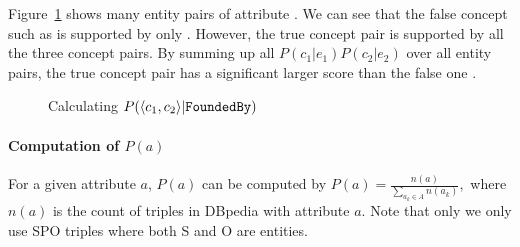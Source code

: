 {\footnotesize
\begin{example}
\label{exa:pggga}
Figure~\ref{fig:bipartite} shows many entity pairs of attribute . 
We can see that the false concept such as  is supported by only .
However, the true concept pair  is supported by all the three concept pairs. 
By summing up all $P(c_1|e_1)P(c_2|e_2) $ over all entity pairs, the true concept pair  has a significant larger score than the false one .
\end{example}
}


\begin{figure}[!htb]
\vspace{-6mm}
\centering
{}
\vspace{-8mm}
\caption{Calculating $P(  \langle {c}_{1},{c}_{2} \rangle  | {\tt FoundedBy} )$ }
\label{fig:bipartite}
\vspace{-3mm}
\end{figure}

\vspace{-2mm}
\paragraph{Computation of $P(a)$}
For a given attribute $a$, $P(a)$ can be computed by
$
P(a)=\frac{n(a)}{\sum_{a_k\in A}{n(a_k)}},
$
where $n(a)$ is the count of triples in DBpedia with attribute $a$.
Note that only we only use SPO triples where both S and O are entities.


%
%
%







